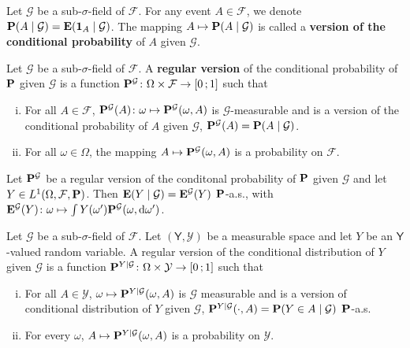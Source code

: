 	\begin{defn}
		Let $\mathcal{G}$ be a sub-$\sigma$-field of $\mathcal{F}$.
		For any event $A \in \mathcal{F}$, we denote $\mathbf{P}(A \mid \mathcal{G}) = \mathbf{E}(\operatorname{\mathbf{1}}_A \mid \mathcal{G})$.
		The mapping $A \mapsto \mathbf{P}(A \mid \mathcal{G})$ is called a \textbf{version of the conditional probability} of $A$ given $\mathcal{G}$.
	\end{defn}

	\begin{defn}
		Let $\mathcal{G}$ be a sub-$\sigma$-field of $\mathcal{F}$.
		A \textbf{regular version} of the conditional probability of $\mathbf{P}$ given $\mathcal{G}$ is a function $\mathbf{P}^{\mathcal{G}} \colon \Omega \times \mathcal{F} \to \mathopen{}\mathclose{\left[0\mathclose{}\mathpunct{};1\right]}$ such that
		\begin{enumerate}[(i)]
			\item For all $A \in \mathcal{F}$, $\mathbf{P}^{\mathcal{G}}(A) \colon \omega \mapsto \mathbf{P}^{\mathcal{G}}(\omega, A)$ is $\mathcal{G}$-measurable and is a version of the conditional probability of $A$ given $\mathcal{G}$, $\mathbf{P}^{\mathcal{G}}(A) = \mathbf{P}(A \mid \mathcal{G})$.
			\item For all $\omega \in \Omega$, the mapping $A \mapsto \mathbf{P}^{\mathcal{G}}(\omega, A)$ is a probability on $\mathcal{F}$.
		\end{enumerate}
	\end{defn}
	
	\begin{lem}
		Let $\mathbf{P}^{\mathcal{G}}$ be a regular version of the conditonal probability of $\mathbf{P}$ given $\mathcal{G}$ and let $Y \in L^1(\Omega, \mathcal{F}, \mathbf{P})$.
		Then $\mathbf{E}(Y \mid \mathcal{G}) = \mathbf{E}^{\mathcal{G}}(Y)$ $\mathbf{P}$-a.s., with $\mathbf{E}^{\mathcal{G}}(Y) \colon \omega \mapsto \int Y(\omega') \mathbf{P}^{\mathcal{G}}(\omega, \mathop{}\mathopen{}\mathrm{d} \omega')$.
	\end{lem}

	\begin{defn}
		Let $\mathcal{G}$ be a sub-$\sigma$-field of $\mathcal{F}$.
		Let $(\mathsf{Y}, \mathcal{Y})$ be a measurable space and let $Y$ be an $\mathsf{Y}$-valued random variable.
		A regular version of the conditional distribution of $Y$ given $\mathcal{G}$ is a function $\mathbf{P}^{Y \mid \mathcal{G}} \colon \Omega \times \mathcal{Y} \to \mathopen{}\mathclose{\left[0\mathclose{}\mathpunct{};1\right]}$ such that
		\begin{enumerate}[(i)]
			\item For all $A \in \mathcal{Y}$, $\omega \mapsto \mathbf{P}^{Y \mid \mathcal{G}}(\omega, A)$ is $\mathcal{G}$ measurable and is a version of conditional distribution of $Y$ given $\mathcal{G}$, $\mathbf{P}^{Y \mid \mathcal{G}}(\cdot, A) = \mathbf{P}(Y \in A \mid \mathcal{G})$ $\mathbf{P}$-a.s.
			\item For every $\omega$, $A \mapsto \mathbf{P}^{Y \mid \mathcal{G}}(\omega, A)$ is a probability on $\mathcal{Y}$.
		\end{enumerate}
	\end{defn}

